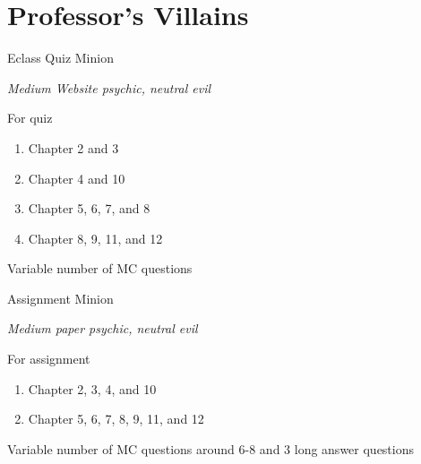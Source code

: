\documentclass[../ECON-281-Notes.tex]{subfiles}
\begin{document}
\chapter{Professor's Villains}

\begin{monsterbox}{Eclass Quiz Minion}
    \begin{hangingpar}
        \textit{Medium Website psychic, neutral evil}
    \end{hangingpar}
    \dndline
    \basics[
        armorclass = Collectively 10,
        hitpoints = 10-20,
        speed = {1 week-ish}
    ]
    \dndline
    \stats[
        STR = \stat{29},
        DEX = \stat{10},
        CON = \stat{17},
        INT = \stat{12},
        WIS = \stat{11},
        CHA = \stat{15},
    ]
    \dndline
    \details[
        languages = {Algebra, Calculus, Microeconomics},
        challenge = {1},
    ]
    \dndline
    For quiz
    \begin{enumerate}
      \item Chapter 2 and 3
      \item Chapter 4 and 10
      \item Chapter 5, 6, 7, and 8
      \item Chapter 8, 9, 11, and 12
    \end{enumerate}
    
    \begin{monsteraction}
        Variable number of MC questions
    \end{monsteraction}
\end{monsterbox}

\begin{monsterbox}{Assignment Minion}
    \begin{hangingpar}
        \textit{Medium paper psychic, neutral evil}
    \end{hangingpar}
    \dndline
    \basics[
        armorclass = Collectively 10,
        hitpoints = 100,
        speed = {2-3 week-ish}
    ]
    \dndline
    \stats[
        STR = \stat{29},
        DEX = \stat{10},
        CON = \stat{17},
        INT = \stat{12},
        WIS = \stat{11},
        CHA = \stat{15},
    ]
    \dndline
    \details[
        languages = {Algebra, Calculus, Microeconomics},
        challenge = {1},
    ]
    \dndline
    For assignment
    \begin{enumerate}
      \item Chapter 2, 3, 4, and 10 
      \item Chapter 5, 6, 7, 8, 9, 11, and 12
    \end{enumerate}
    
    \begin{monsteraction}
        Variable number of MC questions around 6-8 and 3 long answer questions
    \end{monsteraction}
\end{monsterbox}
\end{document}

